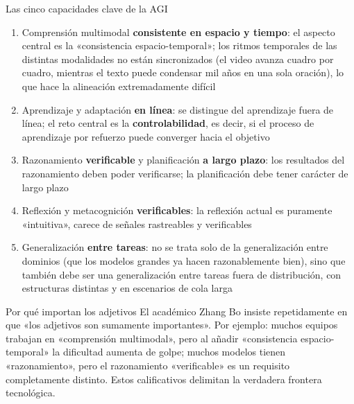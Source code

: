 \begin{importantbox}{Las cinco capacidades clave de la AGI}
\begin{enumerate}
\item Comprensión multimodal \textbf{consistente en espacio y tiempo}: el aspecto central es la «consistencia espacio-temporal»; los ritmos temporales de las distintas modalidades no están sincronizados (el video avanza cuadro por cuadro, mientras el texto puede condensar mil años en una sola oración), lo que hace la alineación extremadamente difícil
\item Aprendizaje y adaptación \textbf{en línea}: se distingue del aprendizaje fuera de línea; el reto central es la \textbf{controlabilidad}, es decir, si el proceso de aprendizaje por refuerzo puede converger hacia el objetivo
\item Razonamiento \textbf{verificable} y planificación \textbf{a largo plazo}: los resultados del razonamiento deben poder verificarse; la planificación debe tener carácter de largo plazo
\item Reflexión y metacognición \textbf{verificables}: la reflexión actual es puramente «intuitiva», carece de señales rastreables y verificables
\item Generalización \textbf{entre tareas}: no se trata solo de la generalización entre dominios (que los modelos grandes ya hacen razonablemente bien), sino que también debe ser una generalización entre tareas fuera de distribución, con estructuras distintas y en escenarios de cola larga
\end{enumerate}
\end{importantbox}

\begin{knowledgebox}{Por qué importan los adjetivos}
El académico Zhang Bo insiste repetidamente en que «los adjetivos son sumamente importantes». Por ejemplo: muchos equipos trabajan en «comprensión multimodal», pero al añadir «consistencia espacio-temporal» la dificultad aumenta de golpe; muchos modelos tienen «razonamiento», pero el razonamiento «verificable» es un requisito completamente distinto. Estos calificativos delimitan la verdadera frontera tecnológica.
\end{knowledgebox}


